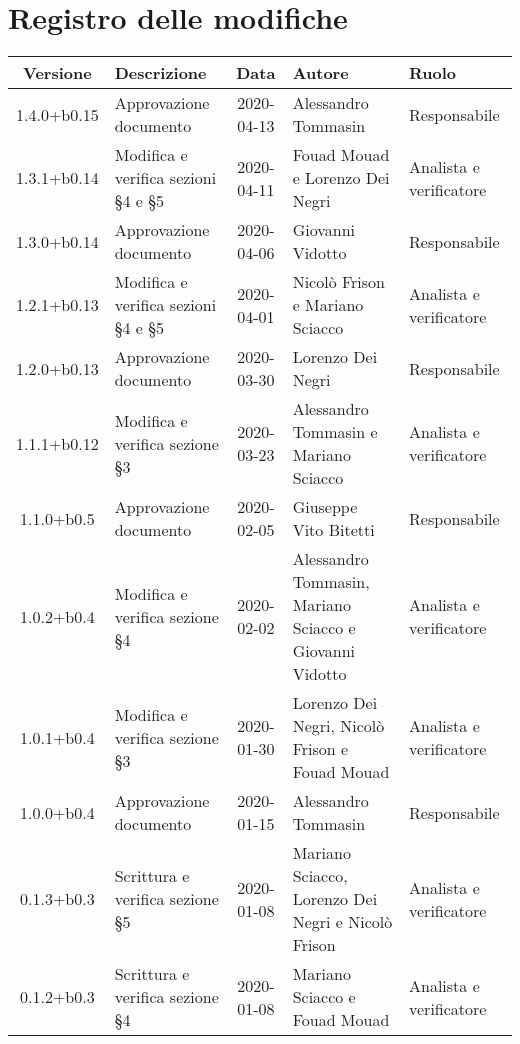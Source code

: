 \section*{Registro delle modifiche}

\begin{center}
	\begin{longtable}{|c|p{3.5cm}|c|p{3cm}|p{3cm}|}
	\hline
	\rowcolor{lighter-grayer}
	\textbf{Versione} & \textbf{Descrizione} & \textbf{Data} & \textbf{Autore} & \textbf{Ruolo} \\
	\hline
	\endfirsthead

	
	1.4.0+b0.15 & Approvazione documento & 2020-04-13 & Alessandro Tommasin & Responsabile \\
	\hline
	1.3.1+b0.14 & Modifica e verifica sezioni \S4 e \S5 & 2020-04-11 & Fouad Mouad e Lorenzo Dei Negri & Analista e verificatore \\
	\hline
	1.3.0+b0.14 & Approvazione documento & 2020-04-06 & Giovanni Vidotto & Responsabile \\
	\hline
	1.2.1+b0.13 & Modifica e verifica sezioni \S4 e \S5 & 2020-04-01 & Nicolò Frison e Mariano Sciacco & Analista e verificatore \\
	\hline
	1.2.0+b0.13 & Approvazione documento & 2020-03-30 & Lorenzo Dei Negri & Responsabile \\
	\hline
	1.1.1+b0.12 & Modifica e verifica sezione \S3 & 2020-03-23 & Alessandro Tommasin e Mariano Sciacco & Analista e verificatore \\
	\hline
	1.1.0+b0.5 & Approvazione documento & 2020-02-05 & Giuseppe Vito Bitetti & Responsabile \\
	\hline
	1.0.2+b0.4 & Modifica e verifica sezione \S4 & 2020-02-02 & Alessandro Tommasin, Mariano Sciacco e Giovanni Vidotto & Analista e verificatore \\
	\hline
	1.0.1+b0.4 & Modifica e verifica sezione \S3 & 2020-01-30 & Lorenzo Dei Negri, Nicolò Frison e Fouad Mouad & Analista e verificatore \\
	\hline
	1.0.0+b0.4 & Approvazione documento & 2020-01-15 & Alessandro Tommasin & Responsabile \\
	\hline
	0.1.3+b0.3 & Scrittura e verifica sezione \S5 & 2020-01-08 & Mariano Sciacco, Lorenzo Dei Negri e Nicolò Frison & Analista e verificatore \\
	\hline
	0.1.2+b0.3 & Scrittura e verifica sezione \S4 & 2020-01-08 & Mariano Sciacco e Fouad Mouad & Analista e verificatore \\

\end{longtable}
\end{center}
